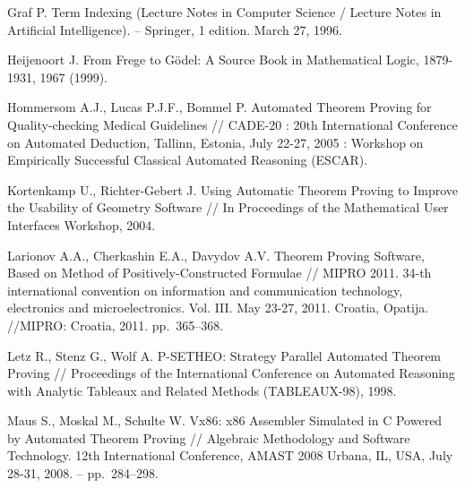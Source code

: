 \begin{thebibliography}{99}
 Graf P. Term Indexing (Lecture Notes in Computer Science / Lecture Notes in Artificial Intelligence). -- Springer, 1 edition. March 27, 1996.



 Heijenoort J. From Frege to Gödel: A Source Book in Mathematical Logic, 1879-1931, 1967 (1999).

 Hommersom A.J., Lucas P.J.F., Bommel P. Automated Theorem Proving for Quality-checking Medical Guidelines // CADE-20 : 20th International Conference on Automated Deduction, Tallinn, Estonia, July 22-27, 2005 : Workshop on Empirically Successful Classical Automated Reasoning (ESCAR).


 Kortenkamp U., Richter-Gebert J. Using Automatic Theorem Proving to Improve the Usability of Geometry Software // In Proceedings of the Mathematical User Interfaces Workshop, 2004.


  Larionov A.A., Cherkashin E.A., Davydov A.V. Theorem Proving Software, Based on Method of Positively-Constructed Formulae // MIPRO 2011. 34-th international convention on information and communication technology, electronics and microelectronics. Vol. III. May 23-27, 2011. Croatia, Opatija. //MIPRO: Croatia, 2011. pp.~365--368.


  Letz R., Stenz G., Wolf A. P-SETHEO: Strategy Parallel Automated Theorem Proving // Proceedings of the International Conference on Automated Reasoning with Analytic Tableaux and Related Methods (TABLEAUX-98), 1998.

 Maus S., Moskal M., Schulte W. Vx86: x86 Assembler Simulated in C Powered by Automated Theorem Proving // Algebraic Methodology and Software Technology. 12th International Conference, AMAST 2008 Urbana, IL, USA, July 28-31, 2008.  -- pp.~284--298.


\end{thebibliography}
